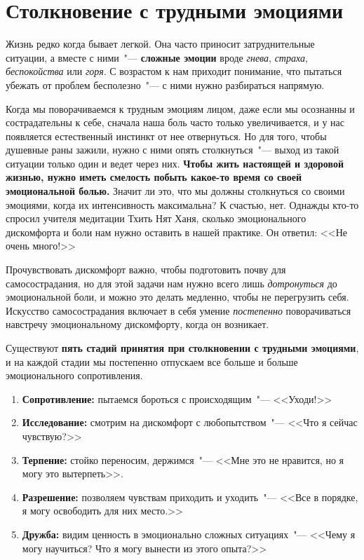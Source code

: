 
\chapter{Столкновение с трудными эмоциями} \label{Meeting_Difficult_Emotions}

Жизнь редко когда бывает легкой. Она часто приносит затруднительные ситуации, а вместе с ними~"--- \textbf{сложные эмоции} вроде \emph{гнева}, \emph{страха}, \emph{беспокойства} или \emph{горя}. С возрастом к нам приходит понимание, что пытаться убежать от проблем бесполезно~"--- с ними нужно разбираться напрямую. 

Когда мы поворачиваемся к трудным эмоциям лицом, даже если мы осознанны и сострадательны к себе, сначала наша боль часто только увеличивается, и у нас появляется естественный инстинкт от нее отвернуться. Но для того, чтобы душевные раны зажили, нужно с ними опять столкнуться~"--- выход из такой ситуации только один и ведет через них. \textbf{Чтобы жить настоящей и здоровой жизнью, нужно иметь смелость побыть какое-то время со своей эмоциональной болью.} Значит ли это, что мы должны столкнуться со своими эмоциями, когда их интенсивность максимальна? К счастью, нет. Однажды кто-то спросил учителя медитации Тхить Нят Ханя, сколько эмоционального дискомфорта и боли нам нужно оставить в нашей практике. Он ответил: <<Не очень много!>> 

Прочувствовать дискомфорт важно, чтобы подготовить почву для самосострадания, но для этой задачи нам нужно всего лишь \emph{дотронуться} до эмоциональной боли, и можно это делать медленно, чтобы не перегрузить себя. Искусство самосострадания включает в себя умение \emph{постепенно} поворачиваться навстречу эмоциональному дискомфорту, когда он возникает. 

\vspace{2ex}

Существуют \textbf{пять стадий принятия при столкновении с трудными эмоциями}, и на каждой стадии мы постепенно отпускаем все больше и больше эмоционального сопротивления\cite{87}. 
\begin{enumerate}
	\item \textbf{Сопротивление:} пытаемся бороться с происходящим~"--- <<Уходи!>>
	\item \textbf{Исследование:} смотрим на дискомфорт с любопытством~"--- <<Что я сейчас чувствую?>>
	\item \textbf{Терпение:} стойко переносим, держимся~"--- <<Мне это не нравится, но я могу это вытерпеть>>.
	\item \textbf{Разрешение:} позволяем чувствам приходить и уходить~"--- <<Все в порядке, я могу освободить для них место.>>
	\item \textbf{Дружба:} видим ценность в эмоционально сложных ситуациях~"--- <<Чему я могу научиться? Что я могу вынести из этого опыта?>>	
\end{enumerate}

